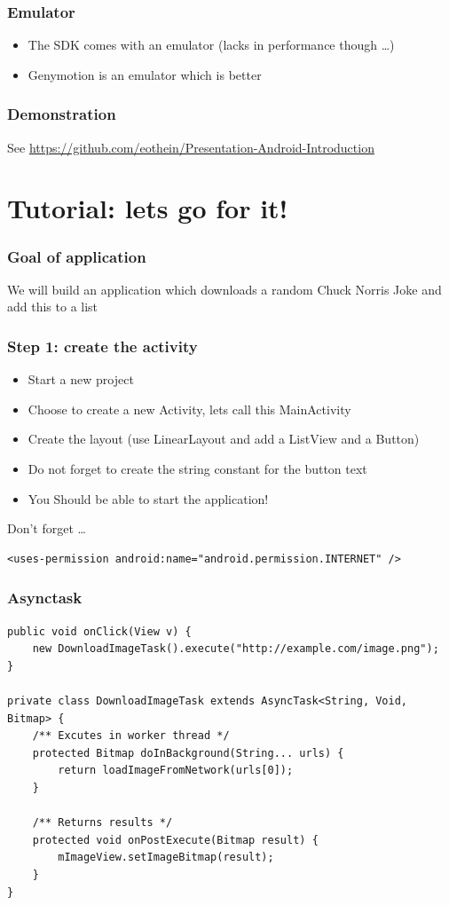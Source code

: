 \documentclass{beamer}
\begin{document}
\begin{frame}
	\frametitle{Emulator}
	
	\begin{itemize}
		\item The SDK comes with an emulator (lacks in performance though \dots )
		\item Genymotion is an emulator which is better
	\end{itemize}
\end{frame}

\begin{frame}
	\frametitle{Demonstration}
	See \url{https://github.com/eothein/Presentation-Android-Introduction}
\end{frame}

\section{Tutorial: lets go for it!}

\begin{frame}
	\frametitle{Goal of application}
	We will build an application which downloads a random Chuck Norris Joke and add this to a list
\end{frame}

\begin{frame}[fragile]
	\frametitle{Step 1: create the activity}
	
	\begin{itemize}
		\item Start a new project
		\item Choose to create a new Activity, lets call this MainActivity
		\item Create the layout (use LinearLayout and add a ListView and a Button)
		\item Do not forget to create the string constant for the button text
		\item You Should be able to start the application!
	\end{itemize}
	\pause
	Don't forget \dots
	\begin{lstlisting}[style=XML]
	 <uses-permission android:name="android.permission.INTERNET" />
	\end{lstlisting}
\end{frame}

\begin{frame}[fragile]
	\frametitle{Asynctask}
		\begin{lstlisting}[style=java]
			public void onClick(View v) {
    new DownloadImageTask().execute("http://example.com/image.png");
}

private class DownloadImageTask extends AsyncTask<String, Void, Bitmap> {
    /** Excutes in worker thread */
    protected Bitmap doInBackground(String... urls) {
        return loadImageFromNetwork(urls[0]);
    }
    
    /** Returns results */
    protected void onPostExecute(Bitmap result) {
        mImageView.setImageBitmap(result);
    }
}
		\end{lstlisting}
\end{frame}
\end{document}
